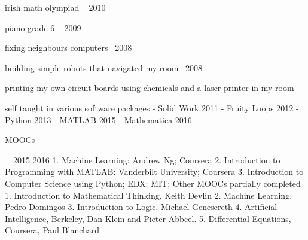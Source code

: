 irish math olympiad                           ~ 2010



piano grade 6                                 ~ 2009



fixing neighbours computers                    ~2008

building simple robots that navigated my room  ~2008

printing my own circuit boards using chemicals and a laser printer in my room

self taught in various software packages  
- Solid Work   2011
- Fruity Loops 2012
- Python       2013
- MATLAB       2015
- Mathematica  2016


MOOCs
-


~~2015 2016
1. Machine Learning: Andrew Ng; Coursera
2. Introduction to Programming with MATLAB: Vanderbilt University; Coursera 3. Introduction to Computer Science using Python; EDX; MIT;
Other MOOCs partially completed
1. Introduction to Mathematical Thinking, Keith Devlin
2. Machine Learning, Pedro Domingos
3. Introduction to Logic, Michael Genesereth
4. Artificial Intelligence, Berkeley, Dan Klein and Pieter Abbeel. 5. Differential Equations, Coursera, Paul Blanchard

